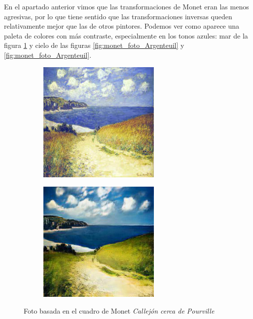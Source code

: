\documentclass[[../main.tex]{subfiles}
\begin{document}
En el apartado anterior vimos que las transformaciones de Monet eran las menos agresivas, por lo que tiene sentido que las transformaciones inversas queden relativamente mejor que las de otros pintores. Podemos ver como aparece una paleta de colores con más contraste, especialmente en los tonos azules: mar de la figura \ref{fig:monet_foto_pourville} y cielo de las figuras \ref{fig:monet_foto_Argenteuil} y \ref{fig:monet_foto_Argenteuil}.

\begin{figure}[!htb]
            \begin{subfigure}[b]{0.49\textwidth}
            \includegraphics[width=0.65\textwidth]{imagenes/cuadro2imagen/monet/00010.jpg}
            \end{subfigure}
        \hfill
            \begin{subfigure}[b]{0.49\textwidth}
\includegraphics[width=0.65\textwidth]{imagenes/cuadro2imagen/monet/00010_2.jpg}
            \end{subfigure}
        \caption{Foto basada en el cuadro de Monet \textit{Callejón cerca de Pourville}}
        \label{fig:monet_foto_pourville}
        \end{figure}
        
\end{document}
